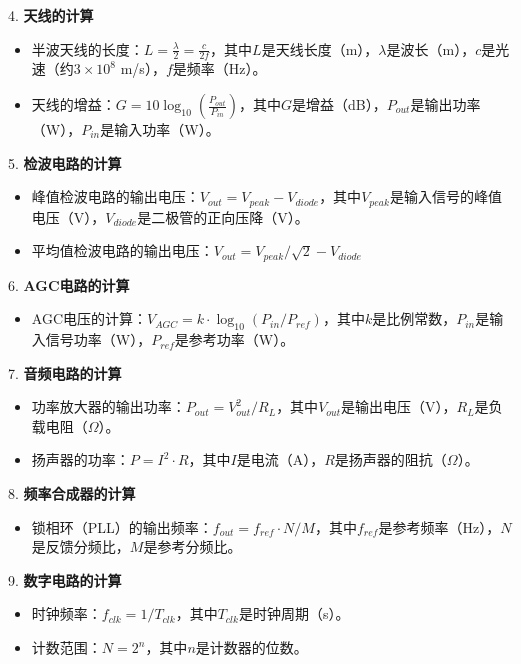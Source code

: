 \documentclass[12pt,UTF8]{ctexbook}
\begin{document}
4. \textbf{天线的计算}
   \begin{itemize}[leftmargin=3.5em]
   \item 半波天线的长度：$L = \frac{\lambda}{2} = \frac{c}{2f}$，其中$L$是天线长度（m），$\lambda$是波长（m），$c$是光速（约$3\times10^8$ m/s），$f$是频率（Hz）。
   \item 天线的增益：$G = 10\log_{10}\left(\frac{P_{out}}{P_{in}}\right)$，其中$G$是增益（dB），$P_{out}$是输出功率（W），$P_{in}$是输入功率（W）。
   \end{itemize}

5. \textbf{检波电路的计算}
   \begin{itemize}[leftmargin=3.5em]
   \item 峰值检波电路的输出电压：$V_{out} = V_{peak} - V_{diode}$，其中$V_{peak}$是输入信号的峰值电压（V），$V_{diode}$是二极管的正向压降（V）。
   \item 平均值检波电路的输出电压：$V_{out} = V_{peak}/\sqrt{2} - V_{diode}$
   \end{itemize}

6. \textbf{AGC电路的计算}
   \begin{itemize}[leftmargin=3.5em]
   \item AGC电压的计算：$V_{AGC} = k \cdot \log_{10}(P_{in}/P_{ref})$，其中$k$是比例常数，$P_{in}$是输入信号功率（W），$P_{ref}$是参考功率（W）。
   \end{itemize}

7. \textbf{音频电路的计算}
   \begin{itemize}[leftmargin=3.5em]
   \item 功率放大器的输出功率：$P_{out} = V_{out}^2/R_L$，其中$V_{out}$是输出电压（V），$R_L$是负载电阻（$\Omega$）。
   \item 扬声器的功率：$P = I^2 \cdot R$，其中$I$是电流（A），$R$是扬声器的阻抗（$\Omega$）。
   \end{itemize}

8. \textbf{频率合成器的计算}
   \begin{itemize}[leftmargin=3.5em]
   \item 锁相环（PLL）的输出频率：$f_{out} = f_{ref} \cdot N/M$，其中$f_{ref}$是参考频率（Hz），$N$是反馈分频比，$M$是参考分频比。
   \end{itemize}

9. \textbf{数字电路的计算}
   \begin{itemize}[leftmargin=3.5em]
   \item 时钟频率：$f_{clk} = 1/T_{clk}$，其中$T_{clk}$是时钟周期（s）。
   \item 计数范围：$N = 2^n$，其中$n$是计数器的位数。
   \end{itemize}
\end{document}
